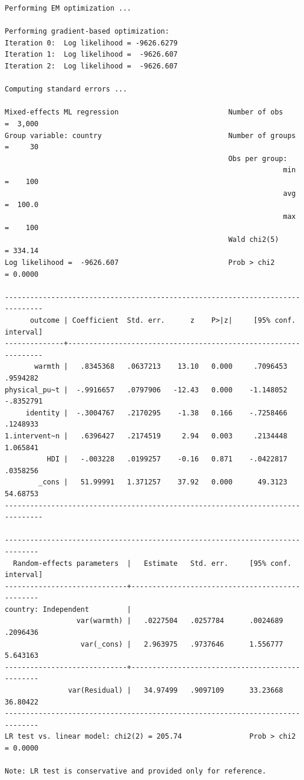\documentclass[
  letterpaper,
  DIV=11,
  numbers=noendperiod]{scrreprt}
\begin{document}
\begin{verbatim}
Performing EM optimization ...

Performing gradient-based optimization: 
Iteration 0:  Log likelihood = -9626.6279  
Iteration 1:  Log likelihood =  -9626.607  
Iteration 2:  Log likelihood =  -9626.607  

Computing standard errors ...

Mixed-effects ML regression                          Number of obs    =  3,000
Group variable: country                              Number of groups =     30
                                                     Obs per group:
                                                                  min =    100
                                                                  avg =  100.0
                                                                  max =    100
                                                     Wald chi2(5)     = 334.14
Log likelihood =  -9626.607                          Prob > chi2      = 0.0000

-------------------------------------------------------------------------------
      outcome | Coefficient  Std. err.      z    P>|z|     [95% conf. interval]
--------------+----------------------------------------------------------------
       warmth |   .8345368   .0637213    13.10   0.000     .7096453    .9594282
physical_pu~t |  -.9916657   .0797906   -12.43   0.000    -1.148052   -.8352791
     identity |  -.3004767   .2170295    -1.38   0.166    -.7258466    .1248933
1.intervent~n |   .6396427   .2174519     2.94   0.003     .2134448    1.065841
          HDI |   -.003228   .0199257    -0.16   0.871    -.0422817    .0358256
        _cons |   51.99991   1.371257    37.92   0.000      49.3123    54.68753
-------------------------------------------------------------------------------

------------------------------------------------------------------------------
  Random-effects parameters  |   Estimate   Std. err.     [95% conf. interval]
-----------------------------+------------------------------------------------
country: Independent         |
                 var(warmth) |   .0227504   .0257784      .0024689    .2096436
                  var(_cons) |   2.963975   .9737646      1.556777    5.643163
-----------------------------+------------------------------------------------
               var(Residual) |   34.97499   .9097109      33.23668    36.80422
------------------------------------------------------------------------------
LR test vs. linear model: chi2(2) = 205.74                Prob > chi2 = 0.0000

Note: LR test is conservative and provided only for reference.
\end{verbatim}
\end{document}
